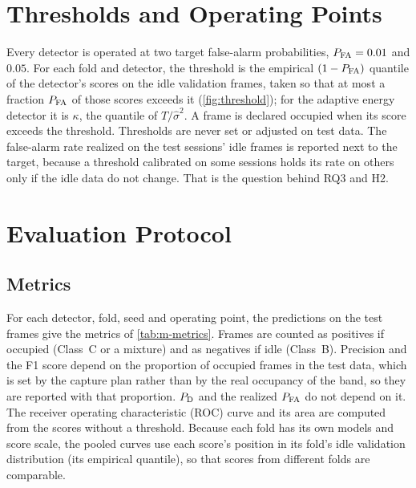 \section{Thresholds and Operating Points}
\label{sec:m-thresholds}

Every detector is operated at two target false-alarm probabilities, $P_{\mathrm{FA}} = 0.01$ and $0.05$. For each fold and detector, the threshold is the empirical $(1 - P_{\mathrm{FA}})$ quantile of the detector's scores on the idle validation frames, taken so that at most a fraction $P_{\mathrm{FA}}$ of those scores exceeds it (\cref{fig:threshold}); for the adaptive energy detector it is $\kappa$, the quantile of $T/\hat{\sigma}^2$. A frame is declared occupied when its score exceeds the threshold. Thresholds are never set or adjusted on test data. The false-alarm rate realized on the test sessions' idle frames is reported next to the target, because a threshold calibrated on some sessions holds its rate on others only if the idle data do not change. That is the question behind RQ3 and H2.

\section{Evaluation Protocol}
\label{sec:m-eval}

\subsection{Metrics}
\label{sec:m-metrics}

For each detector, fold, seed and operating point, the predictions on the test frames give the metrics of \cref{tab:m-metrics}. Frames are counted as positives if occupied (Class~C or a mixture) and as negatives if idle (Class~B). Precision and the F1 score depend on the proportion of occupied frames in the test data, which is set by the capture plan rather than by the real occupancy of the band, so they are reported with that proportion. $P_{\mathrm{D}}$ and the realized $P_{\mathrm{FA}}$ do not depend on it. The receiver operating characteristic (ROC) curve and its area are computed from the scores without a threshold. Because each fold has its own models and score scale, the pooled curves use each score's position in its fold's idle validation distribution (its empirical quantile), so that scores from different folds are comparable.


